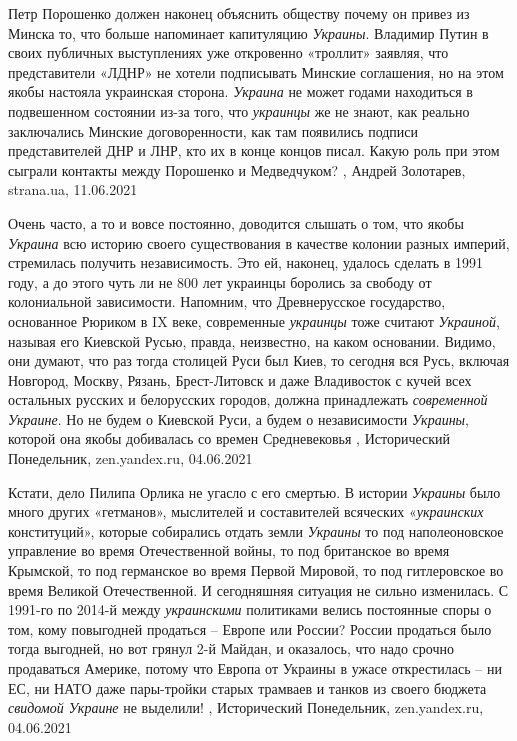 Петр Порошенко должен наконец объяснить обществу почему он привез из Минска то,
что больше напоминает капитуляцию \emph{Украины}.  Владимир Путин в своих публичных
выступлениях уже откровенно «троллит» заявляя, что представители «ЛДНР» не
хотели подписывать Минские соглашения, но на этом якобы настояла украинская
сторона. \emph{Украина} не может годами находиться в подвешенном состоянии из-за
того, что \emph{украинцы} же не знают, как реально заключались Минские договоренности,
как там появились подписи представителей ДНР и ЛНР, кто их в конце концов
писал. Какую роль при этом сыграли контакты между Порошенко и Медведчуком?
, Андрей Золотарев, strana.ua, 11.06.2021

Очень часто, а то и вовсе постоянно, доводится слышать о том, что якобы \emph{Украина}
всю историю своего существования в качестве колонии разных империй, стремилась
получить независимость. Это ей, наконец, удалось сделать в 1991 году, а до
этого чуть ли не 800 лет украинцы боролись за свободу от колониальной
зависимости.  Напомним, что Древнерусское государство, основанное Рюриком в IX
веке, современные \emph{украинцы} тоже считают \emph{Украиной}, называя его Киевской Русью,
правда, неизвестно, на каком основании. Видимо, они думают, что раз тогда
столицей Руси был Киев, то сегодня вся Русь, включая Новгород, Москву, Рязань,
Брест-Литовск и даже Владивосток с кучей всех остальных русских и белорусских
городов, должна принадлежать \emph{современной Украине}. Но не будем о Киевской Руси,
а будем о независимости \emph{Украины}, которой она якобы добивалась со времен
Средневековья
, 
Исторический Понедельник, zen.yandex.ru, 04.06.2021

Кстати, дело Пилипа Орлика не угасло с его смертью. В истории \emph{Украины} было
много других «гетманов», мыслителей и составителей всяческих «\emph{украинских}
конституций», которые собирались отдать земли \emph{Украины} то под наполеоновское
управление во время Отечественной войны, то под британское во время Крымской,
то под германское во время Первой Мировой, то под гитлеровское во время Великой
Отечественной. И сегодняшняя ситуация не сильно изменилась. С 1991-го по
2014-й между \emph{украинскими} политиками велись постоянные споры о том, кому
повыгодней продаться – Европе или России? России продаться было тогда выгодней,
но вот грянул 2-й Майдан, и оказалось, что надо срочно продаваться Америке,
потому что Европа от Украины в ужасе открестилась – ни ЕС, ни НАТО даже
пары-тройки старых трамваев и танков из своего бюджета \emph{свидомой Украине} не
выделили!
, 
Исторический Понедельник, zen.yandex.ru, 04.06.2021

